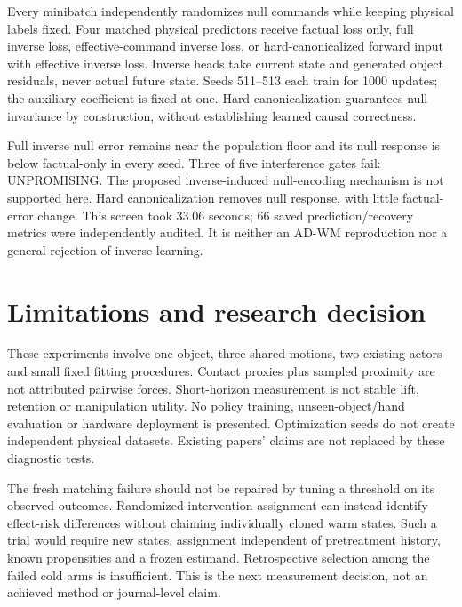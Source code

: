 \documentclass[10pt]{article}
\begin{document}
Every minibatch independently randomizes null commands while keeping physical
labels fixed. Four matched physical predictors receive factual loss only, full
inverse loss, effective-command inverse loss, or hard-canonicalized forward input
with effective inverse loss. Inverse heads take current state and generated object
residuals, never actual future state. Seeds 511--513 each train for 1000 updates;
the auxiliary coefficient is fixed at one. Hard canonicalization guarantees null
invariance by construction, without establishing learned causal correctness.

\begin{table}[h]
\centering

\caption{Exact-null intervention diagnostics, near stratum and seed means. Untrained null-head coordinates in effective/quotient variants are diagnostic only.}
\end{table}

Full inverse null error remains near the population floor and its null response is
below factual-only in every seed. Three of five interference gates fail: UNPROMISING.
The proposed inverse-induced null-encoding mechanism is not supported here.
Hard canonicalization removes null response, with little factual-error change.
This screen took 33.06 seconds; 66 saved prediction/recovery metrics were independently
audited. It is neither an AD-WM reproduction nor a general rejection of inverse learning.

\section{Limitations and research decision}
These experiments involve one object, three shared motions, two existing actors
and small fixed fitting procedures. Contact proxies plus sampled proximity are
not attributed pairwise forces. Short-horizon measurement is not stable lift,
retention or manipulation utility. No policy training, unseen-object/hand evaluation
or hardware deployment is presented. Optimization seeds do not create independent
physical datasets. Existing papers' claims are not replaced by these diagnostic tests.

The fresh matching failure should not be repaired by tuning a threshold on its
observed outcomes. Randomized intervention assignment can instead identify effect-risk
differences without claiming individually cloned warm states. Such a trial would
require new states, assignment independent of pretreatment history, known propensities
and a frozen estimand. Retrospective selection among the failed cold arms is insufficient.
This is the next measurement decision, not an achieved method or journal-level claim.
\end{document}
